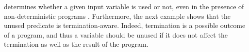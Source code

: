  determines whether a given input variable is used or not, even in the presence of non-deterministic programs%
.
Furthermore, the next example shows that the unused predicate is termination-aware.
Indeed, termination is a possible outcome of a program, and thus a variable should be unused if it does not affect the termination as well as the result of the program.

